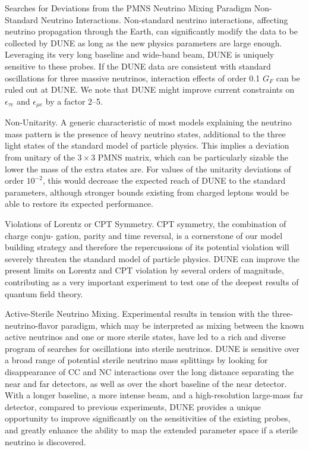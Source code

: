 Searches for Deviations from the PMNS Neutrino Mixing Paradigm
Non-Standard Neutrino Interactions. Non-standard neutrino interactions, affecting neutrino propagation through the Earth, can significantly modify the data to be collected by DUNE as long as the new physics parameters are large enough. Leveraging its very long baseline and wide-band beam, DUNE is uniquely sensitive to these probes. If the DUNE data are consistent with standard oscillations for three massive neutrinos, interaction effects of order 0.1 $G_{F}$ can be ruled out at DUNE. We note that DUNE might improve current constraints on $\epsilon_{\tau e}$ and $\epsilon_{\mu e}$ by a factor 2--5.

Non-Unitarity. A generic characteristic of most models explaining the neutrino mass pattern is the presence of heavy neutrino states, additional to the three light states of the standard model of particle physics. This implies a deviation from unitary of the $3 \times 3$ PMNS matrix, which can be particularly sizable the lower the mass of the extra states are.  For values of the unitarity deviations of order $10^{−2}$, this would decrease the expected reach of DUNE to the standard parameters, although stronger bounds existing from charged leptons would be able to restore its expected performance.

Violations of Lorentz or CPT Symmetry. CPT symmetry, the combination of charge conju- gation, parity and time reversal, is a cornerstone of our model building strategy and therefore the repercussions of its potential violation will severely threaten the standard model of particle physics. DUNE can improve the present limits on Lorentz and CPT violation by several orders of magnitude, contributing as a very important experiment to test one of the deepest results of quantum field theory.

Active-Sterile Neutrino Mixing. Experimental results in tension with the three-neutrino-flavor paradigm, which may be interpreted as mixing between the known active neutrinos and one or more sterile states, have led to a rich and diverse program of searches for oscillations into sterile neutrinos. DUNE is sensitive over a broad range of potential sterile neutrino mass splittings by looking for disappearance of CC and NC interactions over the long distance separating the near and far detectors, as well as over the short baseline of the near detector. With a longer baseline, a more intense beam, and a high-resolution large-mass far detector, compared to previous experiments, DUNE provides a unique opportunity to improve significantly on the sensitivities of the existing probes, and greatly enhance the ability to map the extended parameter space if a sterile neutrino is discovered.

